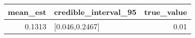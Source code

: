 \begin{longtable}{rlr}
\toprule
mean\_est & credible\_interval\_95 & true\_value \\ 
\midrule
0.1313 & [0.046,0.2467] & 0.01 \\ 
\bottomrule
\end{longtable}

